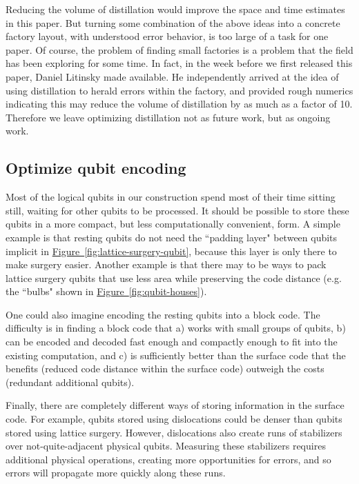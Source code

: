 \documentclass[a4paper, onecolumn, accepted=2021-03-29]{quantumarticle}
\newcommand{\fig}[1]{\hyperref[fig:#1]{Figure~\ref*{fig:#1}}}
\begin{document}
Reducing the volume of distillation would improve the space and time estimates in this paper.
But turning some combination of the above ideas into a concrete factory layout, with understood error behavior, is too large of a task for one paper.
Of course, the problem of finding small factories is a problem that the field has been exploring for some time.
In fact, in the week before we first released this paper, Daniel Litinsky made \cite{litinski2019magic} available.
He independently arrived at the idea of using distillation to herald errors within the factory, and provided rough numerics indicating this may reduce the volume of distillation by as much as a factor of 10.
Therefore we leave optimizing distillation not as future work, but as ongoing work.


\subsection{Optimize qubit encoding}

Most of the logical qubits in our construction spend most of their time sitting still, waiting for other qubits to be processed.
It should be possible to store these qubits in a more compact, but less computationally convenient, form.
A simple example is that resting qubits do not need the ``padding layer" between qubits implicit in \fig{lattice-surgery-qubit}, because this layer is only there to make surgery easier.
Another example is that there may to be ways to pack lattice surgery qubits that use less area while preserving the code distance (e.g. the ``bulbs" shown in \fig{qubit-houses}).

One could also imagine encoding the resting qubits into a block code.
The difficulty is in finding a block code that a) works with small groups of qubits, b) can be encoded and decoded fast enough and compactly enough to fit into the existing computation, and c) is sufficiently better than the surface code that the benefits (reduced code distance within the surface code) outweigh the costs (redundant additional qubits).

Finally, there are completely different ways of storing information in the surface code.
For example, qubits stored using dislocations \cite{hastings2014dislocations} could be denser than qubits stored using lattice surgery.
However, dislocations also create runs of stabilizers over not-quite-adjacent physical qubits.
Measuring these stabilizers requires additional physical operations, creating more opportunities for errors, and so errors will propagate more quickly along these runs.
\end{document}

